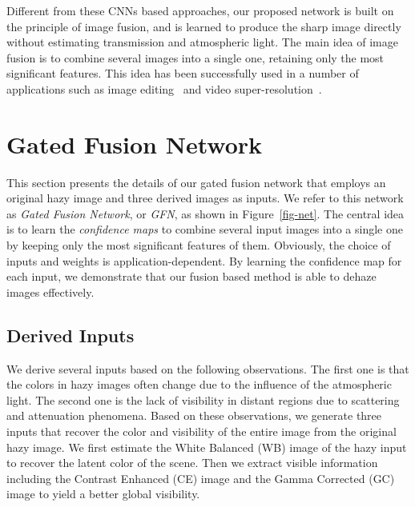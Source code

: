 \documentclass[10pt,twocolumn,letterpaper]{article}
\begin{document}
Different from these CNNs based approaches,
our proposed network is built on the principle of image fusion,
and is learned to produce the sharp image
directly without estimating transmission and atmospheric light.
The main idea of image fusion is to combine several images
into a single one, retaining only the most significant features.
This idea has been successfully used in a number of applications such as image editing~\cite{perez2003poisson} and video super-resolution~\cite{liu2017robust}.





\vspace{-1mm}
\section{Gated Fusion Network}
This section presents the details of our gated fusion network
that employs an original hazy image and three derived images as inputs.
We refer to this network as \textit{Gated Fusion Network}, or \textit{GFN}, as shown in Figure~\ref{fig-net}.
The central idea is to learn the \textit{confidence maps} to
combine several input images into a
single one by keeping only the most significant features
of them.
Obviously, the choice of inputs and weights is
application-dependent. By learning the confidence map
for each input, we demonstrate that our fusion based method is
able to dehaze images effectively.

\subsection{Derived Inputs}
\label{sec-inputs}
We derive several inputs based on the following observations.
The first one is that the colors in hazy images often change due to the influence of the atmospheric light.
The second one is the lack of visibility in distant regions
due to scattering and attenuation phenomena.
Based on these observations, we generate three inputs that recover the
color and visibility of the entire image from the original hazy image.
We first estimate the White Balanced (WB) image  of the hazy input 
to recover the latent color of the scene.
Then we extract visible information including the
Contrast Enhanced (CE) image  and the Gamma Corrected (GC) image  to
yield a better global visibility.
\end{document}
